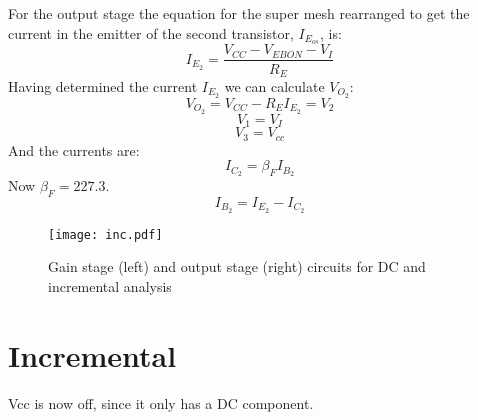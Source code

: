 For the output stage the equation for the super mesh rearranged to get the current in the emitter of the second transistor, $I_{E_{os}}$,  is: 
\begin{equation}
I_{E_2}=\frac{V_{CC}-V_{EBON}-V_I}{R_E}
\end{equation}
Having determined the current $I_{E_2}$ we can calculate $V_{O_2}$:
\begin{equation}
V_{O_2}=V_{CC}-R_E I_{E_2}=V_2
\end{equation}
\begin{equation} 
V_1=V_I
\end{equation}
\begin{equation} 
V_3=V_{cc}
\end{equation}
And the currents are:
\begin{equation}
    I_{C_2}=\beta_F I_{B_2}
\end{equation}
Now $\beta_F=227.3$.
\begin{equation}
    I_{B_2}=I_{E_2}-I_{C_2}
\end{equation}
\begin{figure}[H] \centering
\texttt{[image: inc.pdf]}
\caption{Gain stage (left) and output stage (right) circuits for DC and incremental analysis}
\label{fig:oc2}
\end{figure} 
\section{Incremental}
Vcc is now off, since it only has a DC component.
